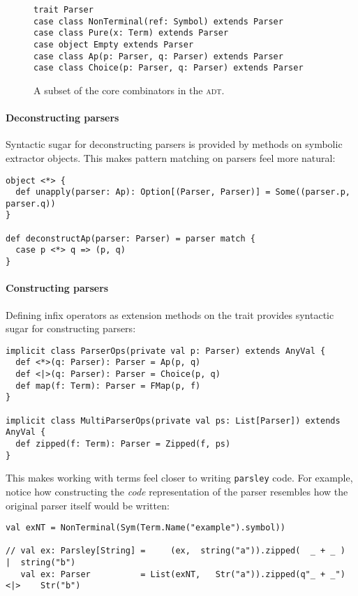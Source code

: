 \documentclass[../../main.tex]{subfiles}
\begin{document}
\begin{figure}[htbp]
\begin{verbatim}
trait Parser
case class NonTerminal(ref: Symbol) extends Parser
case class Pure(x: Term) extends Parser
case object Empty extends Parser
case class Ap(p: Parser, q: Parser) extends Parser
case class Choice(p: Parser, q: Parser) extends Parser
\end{verbatim}
\caption{A subset of the core combinators in the  \textsc{adt}.}
\label{fig:parser-adt}
\end{figure}

\paragraph{Deconstructing parsers}
Syntactic sugar for deconstructing parsers is provided by  methods on symbolic extractor objects.
This makes pattern matching on parsers feel more natural:
\begin{verbatim}
object <*> {
  def unapply(parser: Ap): Option[(Parser, Parser)] = Some((parser.p, parser.q))
}

def deconstructAp(parser: Parser) = parser match {
  case p <*> q => (p, q)
}
\end{verbatim}

\paragraph{Constructing parsers}
Defining infix operators as extension methods on the  trait provides syntactic sugar for constructing parsers:
\begin{verbatim}
implicit class ParserOps(private val p: Parser) extends AnyVal {
  def <*>(q: Parser): Parser = Ap(p, q)
  def <|>(q: Parser): Parser = Choice(p, q)
  def map(f: Term): Parser = FMap(p, f)
}

implicit class MultiParserOps(private val ps: List[Parser]) extends AnyVal {
  def zipped(f: Term): Parser = Zipped(f, ps)
}
\end{verbatim}
%
This makes working with  terms feel closer to writing \texttt{parsley} code.
For example, notice how constructing the \emph{code} representation of the  parser resembles how the original parser itself would be written:
\begin{verbatim}
val exNT = NonTerminal(Sym(Term.Name("example").symbol))  

// val ex: Parsley[String] =     (ex,  string("a")).zipped(  _ + _ )  |  string("b")
   val ex: Parser          = List(exNT,   Str("a")).zipped(q"_ + _") <|>    Str("b")
\end{verbatim}
\end{document}
